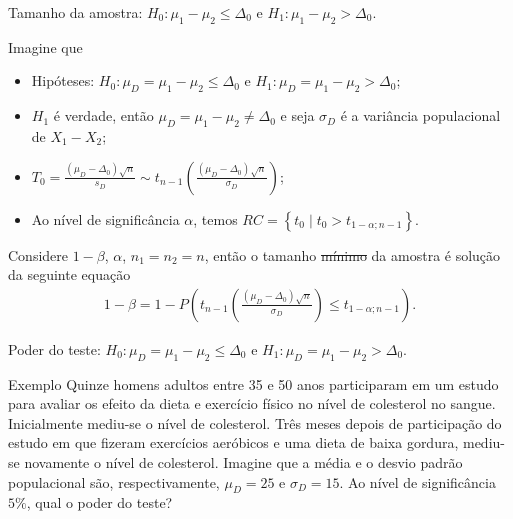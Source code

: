 \documentclass[9pt]{beamer}
\begin{document}
\begin{frame}{Tamanho da amostra: $H_0:\mu_1 - \mu_2 \leq \Delta_0$ e $H_1: \mu_1 - \mu_2 > \Delta_0$.}

\normalsize
Imagine que
\begin{itemize}
	\item Hipóteses: $H_0:\mu_D= \mu_1 - \mu_2 \leq \Delta_0$ e $H_1:\mu_D= \mu_1 -  \mu_2 > \Delta_0$;
	\item $H_1$ é verdade, então $\mu_D = \mu_1-\mu_2 \neq \Delta_0$ e seja $\sigma_D$ é a variância populacional de $X_1 - X_2$;
	\item $T_0 = \frac{(\mu_D - \Delta_0)\sqrt{n}}{s_D} \sim t_{n-1}\left( \frac{(\mu_D - \Delta_0)\sqrt{n}}{\sigma_D} \right)$;
	\item Ao nível de significância $\alpha$, temos $RC = \left\{ t_0 \mid t_0 > t_{1  -\alpha;n-1}  \right\}$.
\end{itemize}
\vfill

Considere $1-\beta$, $\alpha$, $n_1=n_2=n$, então o tamanho \sout{mínimo} da amostra é solução da seguinte equação
\scriptsize
\begin{align*}
1-\beta = 1 - P\left( t_{n-1}\left( \frac{(\mu_D - \Delta_0)\sqrt{n}}{\sigma_D} \right) \leq t_{1-\alpha;n-1} \right).
\end{align*}

\normalsize
\end{frame}

\begin{frame}{Poder do teste: $H_0:\mu_D = \mu_1 - \mu_2 \leq \Delta_0$ e $H_1:\mu_D =  \mu_1 - \mu_2 > \Delta_0$.}

\large
\begin{block}{Exemplo}
	Quinze homens adultos entre 35 e 50 anos participaram em um estudo para avaliar os efeito da dieta e exercício físico no nível de colesterol no sangue. Inicialmente mediu-se o nível de colesterol. Três meses depois de participação do estudo em que fizeram exercícios aeróbicos e uma dieta de baixa gordura,  mediu-se novamente o nível de colesterol. Imagine que a média e o desvio padrão populacional são, respectivamente, $\mu_D = 25$ e $\sigma_D = 15$.  Ao nível de significância $5\%$, qual o poder do teste?
\end{block}
\normalsize

\end{frame}
\end{document}
